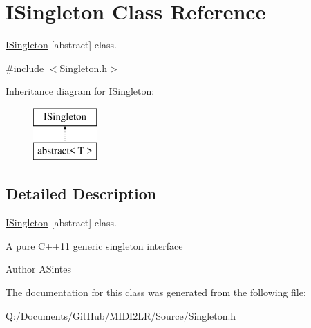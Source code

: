 \hypertarget{class_i_singleton}{}\section{I\+Singleton Class Reference}
\label{class_i_singleton}


\hyperlink{class_i_singleton}{I\+Singleton} \mbox{[}abstract\mbox{]} class.  




{\ttfamily \#include $<$Singleton.\+h$>$}

Inheritance diagram for I\+Singleton\+:\begin{figure}[H]
\begin{center}
\leavevmode
\includegraphics[height=2.000000cm]{class_i_singleton}
\end{center}
\end{figure}


\subsection{Detailed Description}
\hyperlink{class_i_singleton}{I\+Singleton} \mbox{[}abstract\mbox{]} class. 

A pure C++11 generic singleton interface \begin{DoxyAuthor}{Author}
A\+Sintes 
\end{DoxyAuthor}


The documentation for this class was generated from the following file\+:\begin{DoxyCompactItemize}
\item 
Q\+:/\+Documents/\+Git\+Hub/\+M\+I\+D\+I2\+L\+R/\+Source/Singleton.\+h\end{DoxyCompactItemize}
